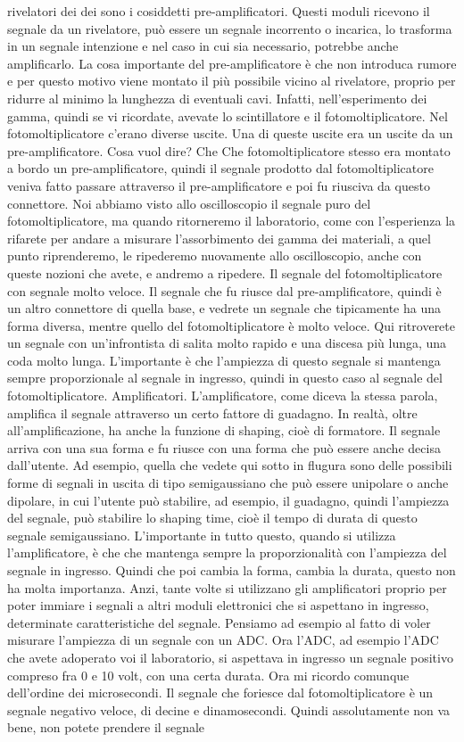 {rivelatori dei dei sono i cosiddetti pre-amplificatori. Questi moduli ricevono il segnale da un rivelatore, può essere un segnale incorrento o incarica, lo trasforma in un segnale intenzione e nel caso in cui sia necessario, potrebbe anche amplificarlo. La cosa importante del pre-amplificatore è che non introduca rumore e per questo motivo viene montato il più possibile vicino al rivelatore, proprio per ridurre al minimo la lunghezza di eventuali cavi. Infatti, nell'esperimento dei gamma, quindi se vi ricordate, avevate lo scintillatore e il fotomoltiplicatore. Nel fotomoltiplicatore c'erano diverse uscite. Una di queste uscite era un uscite da un pre-amplificatore. Cosa vuol dire? Che Che fotomoltiplicatore stesso era montato a bordo un pre-amplificatore, quindi il segnale prodotto dal fotomoltiplicatore veniva fatto passare attraverso il pre-amplificatore e poi fu riusciva da questo connettore. Noi abbiamo visto allo oscilloscopio il segnale puro del fotomoltiplicatore, ma quando ritorneremo il laboratorio, come con l'esperienza la rifarete per andare a misurare l'assorbimento dei gamma dei materiali, a quel punto riprenderemo, le ripederemo nuovamente allo oscilloscopio, anche con queste nozioni che avete, e andremo a ripedere. Il segnale del fotomoltiplicatore con segnale molto veloce. Il segnale che fu riusce dal pre-amplificatore, quindi è un altro connettore di quella base, e vedrete un segnale che tipicamente ha una forma diversa, mentre quello del fotomoltiplicatore è molto veloce. Qui ritroverete un segnale con un'infrontista di salita molto rapido e una discesa più lunga, una coda molto lunga. L'importante è che l'ampiezza di questo segnale si mantenga sempre proporzionale al segnale in ingresso, quindi in questo caso al segnale del fotomoltiplicatore. Amplificatori. L'amplificatore, come diceva la stessa parola, amplifica il segnale attraverso un certo fattore di guadagno. In realtà, oltre all'amplificazione, ha anche la funzione di shaping, cioè di formatore. Il segnale arriva con una sua forma e fu riusce con una forma che può essere anche decisa dall'utente. Ad esempio, quella che vedete qui sotto in flugura sono delle possibili forme di segnali in uscita di tipo semigaussiano che può essere unipolare o anche dipolare, in cui l'utente può stabilire, ad esempio, il guadagno, quindi l'ampiezza del segnale, può stabilire lo shaping time, cioè il tempo di durata di questo segnale semigaussiano. L'importante in tutto questo, quando si utilizza l'amplificatore, è che che mantenga sempre la proporzionalità con l'ampiezza del segnale in ingresso. Quindi che poi cambia la forma, cambia la durata, questo non ha molta importanza. Anzi, tante volte si utilizzano gli amplificatori proprio per poter immiare i segnali a altri moduli elettronici che si aspettano in ingresso, determinate caratteristiche del segnale. Pensiamo ad esempio al fatto di voler misurare l'ampiezza di un segnale con un ADC. Ora l'ADC, ad esempio l'ADC che avete adoperato voi il laboratorio, si aspettava in ingresso un segnale positivo compreso fra 0 e 10 volt, con una certa durata. Ora mi ricordo comunque dell'ordine dei microsecondi. Il segnale che foriesce dal fotomoltiplicatore è un segnale negativo veloce, di decine e dinamosecondi. Quindi assolutamente non va bene, non potete prendere il segnale }

